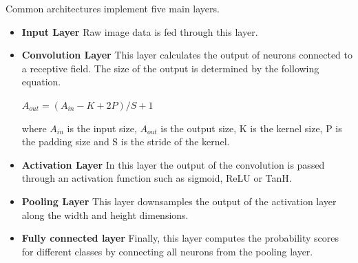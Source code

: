 Common architectures implement five main layers. 
\begin{itemize}[noitemsep]
	\item  \textbf{Input Layer} Raw image data is fed through this layer. 
	\item  \textbf{Convolution Layer} This layer calculates the output of neurons connected to a receptive field.
	The size of the output is determined by the following equation. 
	
	$A_{out}= (A_{in}-K+2P)/S+1$
	
	where $A_{in}$ is the input size,  $A_{out}$ is the output size, K is the kernel size, P is the padding size and S is the stride of the kernel. 
	\item  \textbf{Activation Layer} In this layer the output of the convolution is passed through an activation function such as sigmoid, ReLU or TanH. 
	\item  \textbf{Pooling Layer} This layer downsamples the  output of the activation layer along the width and height dimensions. 
	\item \textbf{Fully connected layer} Finally, this layer computes the probability scores for different classes by connecting all neurons from the pooling layer. 
\end{itemize}


